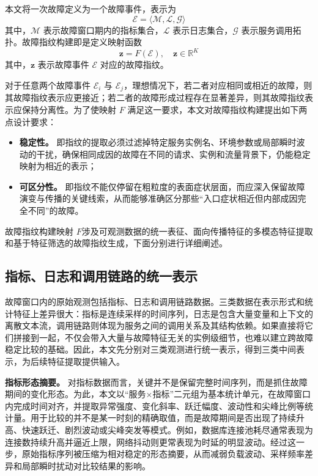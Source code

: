 本文将一次故障定义为一个故障事件，表示为
\begin{equation}
\mathcal{E}=\langle \mathcal{M}, \mathcal{L}, \mathcal{G}\rangle
\end{equation}
其中，$\mathcal{M}$ 表示故障窗口期内的指标集合，$\mathcal{L}$ 表示日志集合，$\mathcal{G}$ 表示服务调用拓扑。故障指纹构建即是定义映射函数
\begin{equation}
\mathbf{z}=F(\mathcal{E}), \quad \mathbf{z}\in\mathbb{R}^{K}
\end{equation}
其中，$\mathbf{z}$ 表示故障事件 $\mathcal{E}$ 对应的故障指纹。

对于任意两个故障事件 $\mathcal{E}_i$ 与 $\mathcal{E}_j$，理想情况下，若二者对应相同或相近的故障，则其故障指纹表示应更接近；若二者的故障形成过程存在显著差异，则其故障指纹表示应保持分离性。为了使映射 $F$ 满足这一要求，本文对故障指纹构建提出如下两点设计要求：

\begin{itemize}
    \item \textbf{稳定性。} 即指纹的提取必须过滤掉特定服务实例名、环境参数或局部瞬时波动的干扰，确保相同成因的故障在不同的请求、实例和流量背景下，仍能稳定映射为相近的表示；
    
    \item \textbf{可区分性。} 即指纹不能仅停留在粗粒度的表面症状层面，而应深入保留故障演变与传播的关键线索，从而能够准确区分那些“入口症状相近但内部成因完全不同”的故障。
\end{itemize}

故障指纹构建映射 $F$涉及可观测数据的统一表征、面向传播特征的多模态特征提取和基于特征筛选的故障指纹生成，下面分别进行详细阐述。

\subsection{指标、日志和调用链路的统一表示}

故障窗口内的原始观测包括指标、日志和调用链路数据。三类数据在表示形式和统计特征上差异很大：指标是连续采样的时间序列，日志是包含大量变量和上下文的离散文本流，调用链路则体现为服务之间的调用关系及其结构依赖。如果直接将它们拼接到一起，不仅会带入大量与故障特征无关的实例级细节，也难以建立跨故障稳定比较的基础。因此，本文先分别对三类观测进行统一表示，得到三类中间表示，为后续特征提取提供输入。

\textbf{指标形态摘要。}
对指标数据而言，关键并不是保留完整时间序列，而是抓住故障期间的变化形态。为此，本文以“服务$\times$指标”二元组为基本统计单元，在故障窗口内完成时间对齐，并提取异常强度、变化斜率、跃迁幅度、波动性和尖峰比例等统计量。用于比较的并不是某一时刻的精确取值，而是故障期间是否出现了持续升高、快速跃迁、剧烈波动或尖峰突发等模式。例如，数据库连接池耗尽通常表现为连接数持续升高并逼近上限，网络抖动则更常表现为时延的明显波动。经过这一步，原始指标序列被压缩为相对稳定的形态摘要，从而减弱负载波动、采样频率差异和局部瞬时扰动对比较结果的影响。

